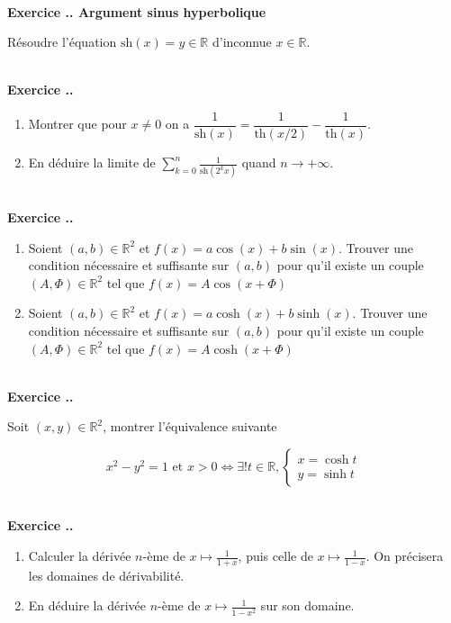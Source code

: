 \documentclass{article}
\newcommand{\mb}[1]{\mathbb{#1}}
\newcounter{exo}
\newcommand{\exercice}[1][\null]{\textbf{\\ Exercice \thesection.\theexo. #1} \addtocounter{exo}{1}}
\begin{document}
\exercice[Argument sinus hyperbolique]

Résoudre l'équation $\text{sh}(x) =y \in \mb{R}$ d'inconnue $x \in \mb{R}$.


\exercice

\begin{enumerate}

\item Montrer que pour $x \neq 0$ on a $\dfrac{1}{\text{sh}(x)} = \dfrac{1}{\text{th}(x/2)} - \dfrac{1}{\text{th}(x)}$.


\item En déduire la limite de $\displaystyle \sum_{k=0}^n \frac{1}{\text{sh}(2^kx)}$ quand $n \rightarrow + \infty$.

\end{enumerate}

\exercice

\begin{enumerate}

    \item Soient $(a,b) \in \mb{R}^2$ et $f(x) = a \cos(x) + b \sin(x)$.
Trouver une condition nécessaire et suffisante sur $(a,b)$
pour qu'il existe un couple $(A,\Phi) \in \mb{R}^2$ tel que 
$f(x) = A \cos (x + \Phi)$

    \item Soient $(a,b) \in \mb{R}^2$ et $f(x) = a \cosh(x) + b \sinh(x)$.
Trouver une condition nécessaire et suffisante sur $(a,b)$
pour qu'il existe un couple $(A,\Phi) \in \mb{R}^2$ tel que 
$f(x) = A \cosh (x + \Phi)$
\end{enumerate}

\exercice

Soit $(x,y) \in \mb{R}^2$, montrer l'équivalence suivante 

\begin{equation*}
    x^2-y^2=1\text{ et }x>0
    \iff
    \exists! t \in \mb{R},
    \begin{cases}
        x = \cosh t \\
        y = \sinh t 
    \end{cases}
\end{equation*}

\exercice 

\begin{enumerate}

\item Calculer la dérivée $n$-ème de $x \mapsto \frac{1}{1+x}$, puis celle de $x \mapsto \frac{1}{1-x}$. On précisera les domaines de dérivabilité.

\item En déduire la dérivée $n$-ème de $x \mapsto \frac{1}{1-x^2}$ sur son domaine.

\end{enumerate}
\end{document}
